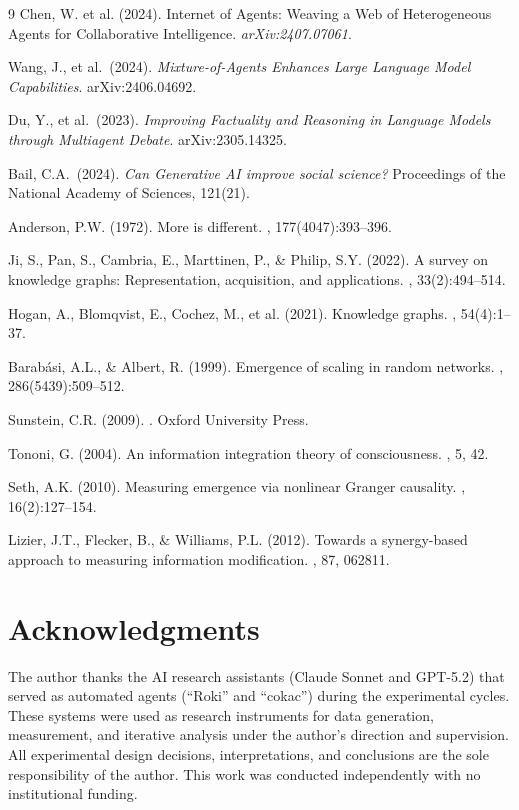 \documentclass[12pt]{article}
\begin{document}
\begin{thebibliography}{9}
  Chen, W. et al. (2024). Internet of Agents: Weaving a Web of Heterogeneous Agents
  for Collaborative Intelligence. \textit{arXiv:2407.07061}.

  Wang, J., et al.\ (2024).
  \textit{Mixture-of-Agents Enhances Large Language Model Capabilities}.
  arXiv:2406.04692.

  Du, Y., et al.\ (2023).
  \textit{Improving Factuality and Reasoning in Language Models through Multiagent Debate}.
  arXiv:2305.14325.

  Bail, C.A.\ (2024).
  \textit{Can Generative AI improve social science?}
  Proceedings of the National Academy of Sciences, 121(21).

Anderson, P.W. (1972).
\newblock More is different.
, 177(4047):393--396.

Ji, S., Pan, S., Cambria, E., Marttinen, P., \& Philip, S.Y. (2022).
\newblock A survey on knowledge graphs: Representation, acquisition, and applications.
, 33(2):494--514.

Hogan, A., Blomqvist, E., Cochez, M., et al. (2021).
\newblock Knowledge graphs.
, 54(4):1--37.

Barab{\'a}si, A.L., \& Albert, R. (1999).
\newblock Emergence of scaling in random networks.
, 286(5439):509--512.

Sunstein, C.R. (2009).
.
\newblock Oxford University Press.

Tononi, G. (2004).
\newblock An information integration theory of consciousness.
, 5, 42.

Seth, A.K. (2010).
\newblock Measuring emergence via nonlinear Granger causality.
, 16(2):127--154.

Lizier, J.T., Flecker, B., \& Williams, P.L. (2012).
\newblock Towards a synergy-based approach to measuring information modification.
, 87, 062811.

\end{thebibliography}


\section*{Acknowledgments}
The author thanks the AI research assistants (Claude Sonnet and GPT-5.2)
that served as automated agents (``Roki'' and ``cokac'') during the
experimental cycles. These systems were used as research instruments
for data generation, measurement, and iterative analysis under the
author's direction and supervision. All experimental design decisions,
interpretations, and conclusions are the sole responsibility of the author.
This work was conducted independently with no institutional funding.
\end{document}
